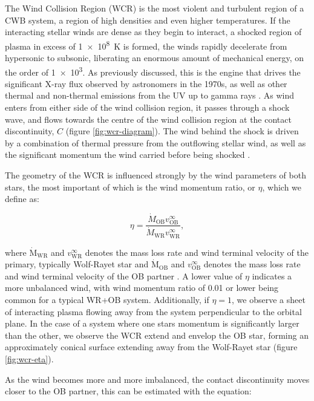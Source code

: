 The Wind Collision Region (WCR) is the most violent and turbulent region of a CWB system, a region of high densities and even higher temperatures.
If the interacting stellar winds are dense as they begin to interact, a shocked region of plasma in excess of \SI{1e8}{\kelvin} is formed, the winds rapidly decelerate from hypersonic to subsonic, liberating an enormous amount of mechanical energy, on the order of \SI{1e3}{\solarluminosity}.
As previously discussed, this is the engine that drives the significant X-ray flux observed by astronomers in the 1970s, as well as other thermal and non-thermal emissions from the UV up to gamma rays \parencite{eichler_particle_1993,grimaldoProtonAccelerationColliding2019}.
As wind enters from either side of the wind collision region, it passes through a shock wave, and flows towards the centre of the wind collision region at the contact discontinuity, $C$ (figure \ref{fig:wcr-diagram}).
The wind behind the shock is driven by a combination of thermal pressure from the outflowing stellar wind, as well as the significant momentum the wind carried before being shocked \parencite{stevens_colliding_1992}.

The geometry of the WCR is influenced strongly by the wind parameters of both stars, the most important of which is the wind momentum ratio, or $\eta$, which we define as:

\begin{equation}
  \eta = \frac{\dot M_\text{OB} v^\infty_\text{OB}}{\dot M_\text{WR} v^\infty_\text{WR}},
\end{equation}

\noindent
where $\dot{\text{M}}_\text{WR}$ and $v^{\infty}_\text{WR}$ denotes the mass loss rate and wind terminal velocity of the primary, typically Wolf-Rayet star and $\dot{\text{M}}_\text{OB}$ and $v^{\infty}_\text{OB}$ denotes the mass loss rate and wind terminal velocity of the OB partner \parencite{usov_stellar_1991}.
A lower value of $\eta$ indicates a more unbalanced wind, with wind momentum ratio of \num{0.01} or lower being common for a typical WR+OB system.
Additionally, if $\eta = 1$, we observe a sheet of interacting plasma flowing away from the system perpendicular to the orbital plane.
In the case of a system where one stars momentum is significantly larger than the other, we observe the WCR extend and envelop the OB star, forming an approximately conical surface extending away from the Wolf-Rayet star (figure \ref{fig:wcr-eta}).


As the wind becomes more and more imbalanced, the contact discontinuity moves closer to the OB partner, this can be estimated with the equation:


